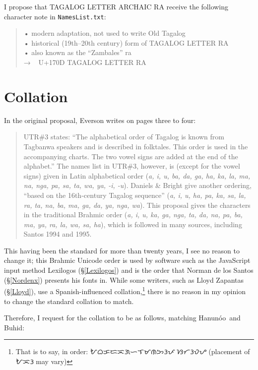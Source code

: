 \documentclass[a4paper,pagesize,openany,14pt,parskip=never]{scrbook}
\newcommand{\≈}{$\approx$}
\newcommand{\ra}{{\baybayin ᜍ}}
\newcommand{\hanunoo}{Hanun\'o\textquotesingle o}
\begin{document}
I propose that \textsf{TAGALOG LETTER ARCHAIC RA} receive the following character note in \texttt{NamesList.txt}:

\begin{quote}
    • modern adaptation, not used to write Old Tagalog \\
    • historical (19th--20th century) form of \textsf{TAGALOG LETTER RA} \\
    • also known as the ``Zambales'' ra \\
    → \ra\ U+170D \textsf{TAGALOG LETTER RA}
\end{quote}

\section{Collation}

In the original proposal, Everson writes on pages three to four:

\begin{quote}
    UTR\#3 states: “The alphabetical order of Tagalog is known from Tagbanwa speakers and is described in folktales. This order is used in the accompanying charts. The two vowel signs are added at the end of the alphabet.” The names list in UTR\#3, however, is (except for the vowel signs) given in Latin alphabetical order ({\em a, i, u, ba, da, ga, ha, ka, la, ma, na, nga, pa, sa, ta, wa, ya, -i, -u}). Daniels \& Bright give another ordering, “based on the 16th-century Tagalog sequence” ({\em a, i, u, ha, pa, ka, sa, la, ra, ta, na, ba, ma, ga, da, ya, nga, wa}). This proposal gives the characters in the traditional Brahmic order ({\em a, i, u, ka, ga, nga, ta, da, na, pa, ba, ma, ya, ra, la, wa, sa, ha}), which is followed in many sources, including Santos 1994 and 1995.
\end{quote}

This having been the standard for more than twenty years, I see no reason to change it; this Brahmic Unicode order is used by software such as the JavaScript input method Lexilogos (\S\ref{Lexilogos}) and is the order that Norman de los Santos (\S\ref{Nordenx}) presents his fonts in. While some writers, such as Lloyd Zapantas (\S\ref{Lloyd}), use a Spanish-influenced collation,\footnote{That is to say, in order: {\baybayin ᜀᜊᜃᜇᜁᜄᜑᜎᜋᜈᜅᜂᜉᜍᜐᜆᜂᜏᜌ} (placement of {\baybayin ᜀᜁᜂ} may vary)} there is no reason in my opinion to change the standard collation to match.

Therefore, I request for the collation to be as follows, matching \hanunoo\ and Buhid:
\end{document}
